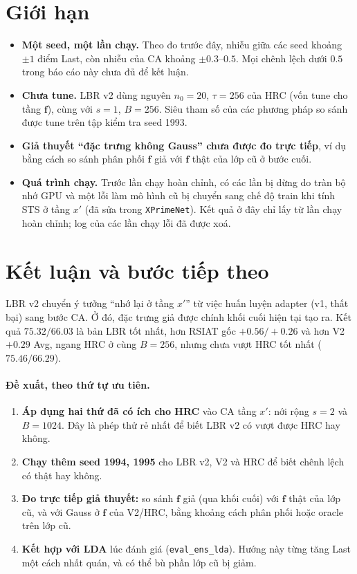 \documentclass[11pt]{article}
\newcommand{\vf}{\mathbf{f}}
\begin{document}
\section{Giới hạn}
\begin{itemize}
\item \textbf{Một seed, một lần chạy.} Theo đo trước đây, nhiễu giữa các seed khoảng $\pm1$ điểm Last, còn nhiễu của CA
      khoảng $\pm0.3$--$0.5$. Mọi chênh lệch dưới $0.5$ trong báo cáo này chưa đủ để kết luận.
\item \textbf{Chưa tune.} LBR v2 dùng nguyên $n_0=20$, $\tau=256$ của HRC (vốn tune cho tầng $\vf$), cùng với $s=1$,
      $B=256$. Siêu tham số của các phương pháp so sánh được tune trên tập kiểm tra seed 1993.
\item \textbf{Giả thuyết ``đặc trưng không Gauss'' chưa được đo trực tiếp}, ví dụ bằng cách so sánh phân phối $\vf$
      giả với $\vf$ thật của lớp cũ ở bước cuối.
\item \textbf{Quá trình chạy.} Trước lần chạy hoàn chỉnh, có các lần bị dừng do tràn bộ nhớ GPU và một lỗi làm mô hình
      cũ bị chuyển sang chế độ train khi tính STS ở tầng $x'$ (đã sửa trong \texttt{XPrimeNet}). Kết quả ở đây chỉ lấy từ lần chạy
      hoàn chỉnh; log của các lần chạy lỗi đã được xoá.
\end{itemize}

\section{Kết luận và bước tiếp theo}
LBR v2 chuyển ý tưởng ``nhớ lại ở tầng $x'$'' từ việc huấn luyện adapter (v1, thất bại) sang bước CA. Ở đó, đặc trưng
giả được chính khối cuối hiện tại tạo ra. Kết quả $75.32/66.03$ là bản LBR tốt nhất, hơn RSIAT gốc $+0.56/+0.26$ và
hơn V2 $+0.29$ Avg, ngang HRC ở cùng $B=256$, nhưng chưa vượt HRC tốt nhất ($75.46/66.29$).

\paragraph{Đề xuất, theo thứ tự ưu tiên.}
\begin{enumerate}
\item \textbf{Áp dụng hai thứ đã có ích cho HRC} vào CA tầng $x'$: nới rộng $s=2$ và $B=1024$. Đây là phép thử rẻ
      nhất để biết LBR v2 có vượt được HRC hay không.
\item \textbf{Chạy thêm seed 1994, 1995} cho LBR v2, V2 và HRC để biết chênh lệch có thật hay không.
\item \textbf{Đo trực tiếp giả thuyết:} so sánh $\vf$ giả (qua khối cuối) với $\vf$ thật của lớp cũ, và với Gauss ở
      $\vf$ của V2/HRC, bằng khoảng cách phân phối hoặc oracle trên lớp cũ.
\item \textbf{Kết hợp với LDA} lúc đánh giá (\texttt{eval\_ens\_lda}). Hướng này từng tăng Last một cách nhất quán, và
      có thể bù phần lớp cũ bị giảm.
\end{enumerate}
\end{document}
